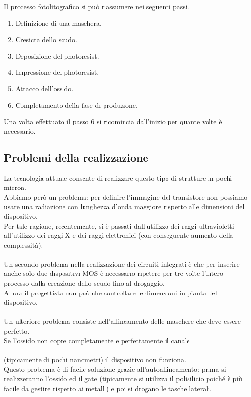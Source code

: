 \documentclass{article}
\numberwithin{equation}{subsection}
\begin{document}
	Il processo fotolitografico si può riassumere nei seguenti passi.
	\begin{enumerate}
		\item Definizione di una maschera.
		\item Cresicta dello scudo.
		\item Deposizione del photoresist.
		\item Impressione del photoresist.
		\item Attacco dell'ossido.
		\item Completamento della fase di produzione.
	\end{enumerate}
	Una volta effettuato il passo 6 si ricomincia dall'inizio per quante volte è necessario.
	\subsection{Problemi della realizzazione}
	La tecnologia attuale consente di realizzare questo tipo di strutture in pochi micron.\\
	Abbiamo però un problema: per definire l'immagine del transistore non possiamo usare una radiazione con lunghezza d'onda maggiore rispetto alle dimensioni del dispositivo.\\
	Per tale ragione, recentemente, si è passati dall'utilizzo dei raggi ultravioletti all'utilizzo dei raggi X e dei raggi elettronici (con conseguente aumento della complessità).\\\\
	Un secondo problema nella realizzazione dei circuiti integrati è che per inserire anche solo due dispositivi MOS è necessario ripetere per tre volte l'intero processo dalla creazione dello scudo fino al drogaggio.\\
	Allora il progettista non può che controllare le dimensioni in pianta del dispositivo.\\\\
	Un ulteriore problema consiste nell'allineamento delle maschere che deve essere perfetto.\\
	Se l'ossido non copre completamente e perfettamente il canale\\\\
	(tipicamente di pochi nanometri) il dispositivo non funziona.\\
	Questo problema è di facile soluzione grazie all'autoallineamento: prima si realizzeranno l'ossido ed il gate (tipicamente si utilizza il polisilicio poiché è più facile da gestire rispetto ai metalli) e poi si drogano le tasche laterali.
\end{document}
